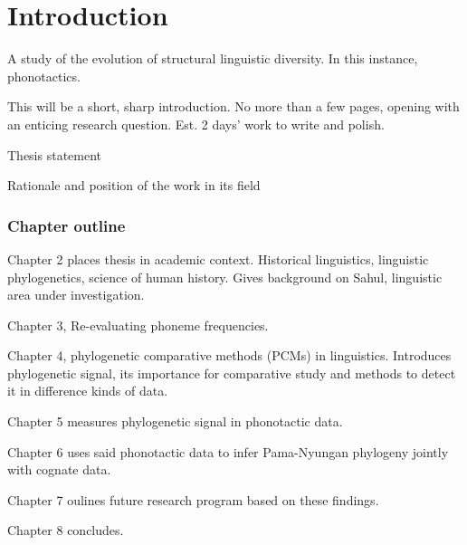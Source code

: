 \chapter[Introduction]{Introduction}
\label{Chap:Intro}


A study of the evolution of structural linguistic diversity. In this instance, phonotactics.

This will be a short, sharp introduction. No more than a few pages, opening with an enticing research question. Est. 2 days' work to write and polish.

Thesis statement

Rationale and position of the work in its field

\hypertarget{chapter-outline}{%
\subsection{Chapter outline}\label{chapter-outline}}

Chapter 2 places thesis in academic context. Historical linguistics, linguistic phylogenetics, science of human history. Gives background on Sahul, linguistic area under investigation.

Chapter 3, Re-evaluating phoneme frequencies.

Chapter 4, phylogenetic comparative methods (PCMs) in linguistics. Introduces phylogenetic signal, its importance for comparative study and methods to detect it in difference kinds of data.

Chapter 5 measures phylogenetic signal in phonotactic data.

Chapter 6 uses said phonotactic data to infer Pama-Nyungan phylogeny jointly with cognate data.

Chapter 7 oulines future research program based on these findings.

Chapter 8 concludes.

